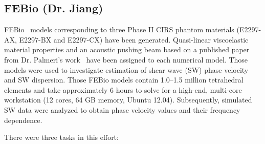 \subsection{FEBio (Dr. Jiang)}
FEBio~\cite{Mass2012} models corresponding to three Phase II CIRS phantom
materials (E2297-AX, E2297-BX and E2297-CX) have been generated. Quasi-linear
viscoelastic material properties and an acoustic pushing beam based on a
published paper from Dr.  Palmeri's work~\cite{Palmeri2008} have been assigned
to each numerical model.  Those models were used to investigate estimation of
shear wave (SW) phase velocity and SW dispersion. Those FEBio models contain
1.0--1.5 million tetrahedral elements and take approximately 6 hours to solve
for a high-end, multi-core workstation (12 cores, 64 GB memory, Ubuntu 12.04).
Subsequently, simulated SW data were analyzed to obtain phase velocity values
and their frequency dependence.

There were three tasks in this effort:

